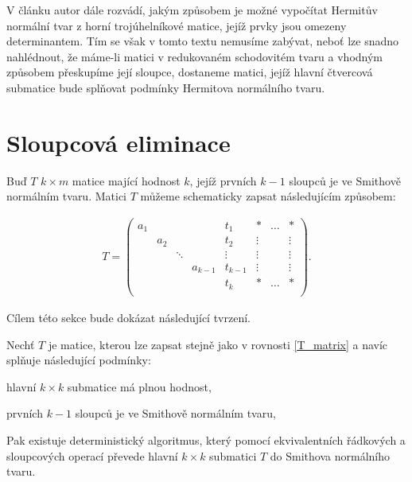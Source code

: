 V článku \cite{SNF_Arne} autor dále rozvádí, jakým způsobem je možné vypočítat
Hermitův normální tvar z horní trojúhelníkové matice, jejíž prvky jsou omezeny
determinantem. Tím se však v tomto textu nemusíme zabývat, neboť lze snadno
nahlédnout, že máme-li matici v redukovaném schodovitém tvaru a vhodným způsobem
přeskupíme její sloupce, dostaneme matici, jejíž hlavní čtvercová submatice bude
splňovat podmínky Hermitova normálního tvaru.

\section{Sloupcová eliminace}

Buď $ T $ $ k \times m $ matice mající hodnost $ k $, jejíž prvních $ k - 1 $
sloupců je ve Smithově normálním tvaru. Matici $ T $ můžeme schematicky zapsat
následujícím způsobem:

\begin{align} \label{T_matrix}
T =
    \left(
    \begin{array}{ccccc|ccc}
        a_1 &     &        &         & t_1     & \ast   & \hdots & \ast   \\
            & a_2 &        &         & t_2     & \vdots &        & \vdots \\
            &     & \ddots &         & \vdots  & \vdots &        & \vdots \\
            &     &        & a_{k-1} & t_{k-1} & \vdots &        & \vdots \\
            &     &        &         & t_k     & \ast   & \hdots & \ast   \\
    \end{array}
    \right)
.
\end{align}

Cílem této sekce bude dokázat následující tvrzení.

\begin{vet} \label{Sloup_elim}
Nechť $ T $ je matice, kterou lze zapsat stejně jako v rovnosti \ref{T_matrix}
a navíc splňuje následující podmínky:
\begin{Cond}[series=Sloup_elim_CONDS]
    \item hlavní $ k \times k $ submatice má plnou hodnost,
    \item prvních $ k - 1 $ sloupců je ve Smithově normálním tvaru,
\end{Cond}
Pak existuje deterministický algoritmus, který pomocí ekvivalentních řádkových
a sloupcových operací převede hlavní $ k \times k $ submatici $ T $ do
Smithova normálního tvaru.
\end{vet}

